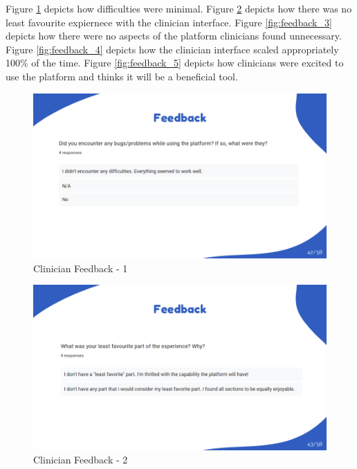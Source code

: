 \documentclass{article}
\begin{document}
\hspace{2em} Figure \ref{fig:feedback_1} depicts how difficulties were minimal.
Figure \ref{fig:feedback_2} depicts how there was no least favourite expiernece with the clinician interface.
Figure \ref{fig:feedback_3} depicts how there were no aspects of the platform clinicians found unnecessary.
Figure \ref{fig:feedback_4} depicts how the clinician interface scaled appropriately 100\% of the time.
Figure \ref{fig:feedback_5} depicts how clinicians were excited to use the platform and thinks it will be a beneficial tool.

\begin{figure}[H]
  \centering
  \includegraphics[width=\textwidth]{images/slide42.png}
  \caption{Clinician Feedback - 1}
  \label{fig:feedback_1}
\end{figure}

\begin{figure}[H]
  \centering
  \includegraphics[width=\textwidth]{images/slide43.png}
  \caption{Clinician Feedback - 2}
  \label{fig:feedback_2}
\end{figure}
\end{document}

